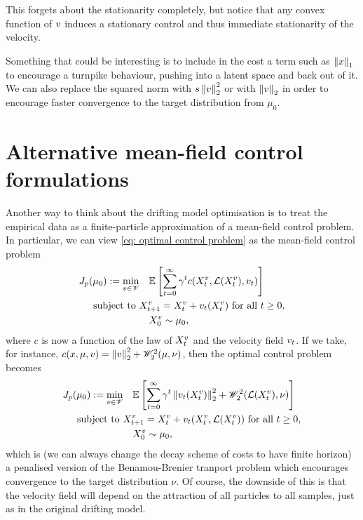 \documentclass[twoside,10pt]{../jmlr}
\begin{document}
This forgets about the stationarity completely, but notice that any convex function of $v$ induces a stationary control and thus immediate stationarity of the velocity. 

Something that could be interesting is to include in the cost a term such as $\left\lVert x\right\rVert_1$ to encourage a turnpike behaviour, pushing into a latent space and back out of it. We can also replace the squared norm with $s\left\lVert v\right\rVert_2^2$ or with $\left\lVert v\right\rVert_2$ in order to encourage faster convergence to the target distribution from $\mu_0$. 


\section{Alternative mean-field control formulations}

Another way to think about the drifting model optimisation is to treat the empirical data as a finite-particle approximation of a mean-field control problem. In particular, we can view \eqref{eq: optimal control problem} as the mean-field control problem
\begin{align}
    J_p(\mu_0):=\min_{v\in\mathscr{V}}&\quad \mathbb{E}\left[\sum_{t=0}^{\infty} \gamma^t c(X_t^v, \mathcal{L}(X_t^v),v_t) \right]\\
    \mbox{ subject to }& X_{t+1}^v=X_t^v+ v_t(X_t^v) \mbox{ for all } t\ge 0,\notag \\
    &\quad X_0^v\sim\mu_0,\notag
\end{align}
where $c$ is now a function of the law of $X_t^v$ and the velocity field $v_t$. If we take, for instance, $c(x,\mu,v)=\left\lVert v\right\rVert^2_2+\mathscr{W}_2^2(\mu,\nu)$, then the optimal control problem becomes
\begin{align}
    J_p(\mu_0):=\min_{v\in\mathscr{V}}&\quad \mathbb{E}\left[\sum_{t=0}^{\infty} \gamma^t \left\lVert v_t(X_t^v)\right\rVert^2_2+\mathscr{W}_2^2(\mathcal{L}(X_t^v),\nu) \right]\\
    \mbox{ subject to }& X_{t+1}^v=X_t^v+ v_t(X_t^v,\mathcal{L}(X_t^v)) \mbox{ for all } t\ge 0,\notag \\
    &\quad X_0^v\sim\mu_0,\notag
\end{align}
which is (we can always change the decay scheme of costs to have finite horizon) a penalised version of the Benamou-Brenier tranport problem which encourages convergence to the target distribution $\nu$. Of course, the downside of this is that the velocity field will depend on the attraction of all particles to all samples, just as in the original drifting model. 
\end{document}
